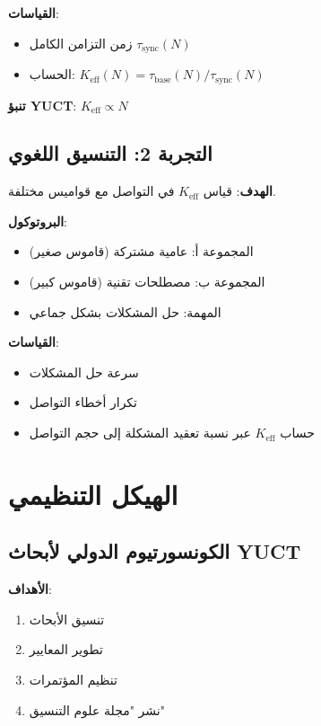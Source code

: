 \documentclass[12pt,a4paper]{article}
\begin{document}
	\textbf{القياسات}:
	\begin{itemize}
		\item زمن التزامن الكامل $\tau_{\mathrm{sync}}(N)$
		\item الحساب: $K_{\mathrm{eff}}(N) = \tau_{\mathrm{base}}(N)/\tau_{\mathrm{sync}}(N)$
	\end{itemize}
	
	\textbf{تنبؤ YUCT}: $K_{\mathrm{eff}} \propto N$
	
	\subsection{التجربة 2: التنسيق اللغوي}
	
	\textbf{الهدف}: قياس $K_{\mathrm{eff}}$ في التواصل مع قواميس مختلفة.
	
	\textbf{البروتوكول}:
	\begin{itemize}
		\item المجموعة أ: عامية مشتركة (قاموس صغير)
		\item المجموعة ب: مصطلحات تقنية (قاموس كبير)
		\item المهمة: حل المشكلات بشكل جماعي
	\end{itemize}
	
	\textbf{القياسات}:
	\begin{itemize}
		\item سرعة حل المشكلات
		\item تكرار أخطاء التواصل
		\item حساب $K_{\mathrm{eff}}$ عبر نسبة تعقيد المشكلة إلى حجم التواصل
	\end{itemize}
	
	\section{الهيكل التنظيمي}
	
	\subsection{الكونسورتيوم الدولي لأبحاث YUCT}
	
	\textbf{الأهداف}:
	\begin{enumerate}
		\item تنسيق الأبحاث
		\item تطوير المعايير
		\item تنظيم المؤتمرات
		\item نشر "مجلة علوم التنسيق"
	\end{enumerate}
	
\end{document}
